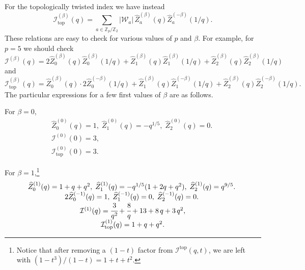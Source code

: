 \documentclass[hyper,letterpaper]{JHEP3}
\newcommand{\Z}{{\mathbb Z}}
\renewcommand{\hat}{\widehat}
\def\CI{{\mathcal I}}
\def\CW{{\mathcal W}}
\begin{document}
For the topologically twisted index we have instead
\begin{equation}
	\CI_\text{top}^{(\beta)}(q)=\sum_{a\in \Z_p/\Z_2}
	|\CW_a|\,\hat{Z}_a^{(\beta)}(q)\hat{Z}_a^{(-\beta)}(1/q).
	\label{Itopbeta-factorization}
\end{equation}
These relations are easy to check for various values of $p$ and $\beta$. For example, for $p=5$ we should check
\begin{equation}
	\CI^{(\beta)}(q)=2\hat{Z}_0^{(\beta)}(q)\hat{Z}_0^{(\beta)}(1/q)+
	\hat{Z}_1^{(\beta)}(q)\hat{Z}_1^{(\beta)}(1/q)+
	\hat{Z}_2^{(\beta)}(q)\hat{Z}_2^{(\beta)}(1/q)
\end{equation}
and
\begin{equation}
	\CI_\text{top}^{(\beta)}(q)=\hat{Z}_0^{(\beta)}(q)\cdot 2\hat{Z}_0^{(-\beta)}(1/q)+
	\hat{Z}_1^{(\beta)}(q)\hat{Z}_1^{(-\beta)}(1/q)+
	\hat{Z}_2^{(\beta)}(q)\hat{Z}_2^{(-\beta)}(1/q).
\end{equation}
The particular expressions for a few first values of $\beta$ are as follows.

For $\beta=0$,
\begin{equation}	
	\begin{array}{c}
	
	\hat{Z}_0^{(0)}(q)=1,\;
	\hat{Z}_1^{(0)}(q)=-q^{1/5},\;
	\hat{Z}_2^{(0)}(q)=0.\; \\
		\CI^{(0)}(0)=3 ,\\
	\CI_\text{top}^{(0)}(0)=3.
	\end{array}
\end{equation}

For $\beta=1$,\footnote{Notice that after removing a $(1-t)$ factor from $\CI^{\text{top}}(q,t)$, we are left with $(1-t^3)/(1-t)=1+t+t^2$.}
\begin{equation}		
	\begin{array}{c}

	\hat{Z}_0^{(1)}(q)=1+q+q^2,\;
	\hat{Z}_1^{(1)}(q)=-q^{1/5}(1+2q+q^2),\;
	\hat{Z}_2^{(1)}(q)=q^{9/5}.\;
	 \\
	2\hat{Z}_0^{(-1)}(q)=1,\;
	\hat{Z}_1^{(-1)}(q)=0,\;
	\hat{Z}_2^{(-1)}(q)=0.\;
	 \\
	 \CI^{(1)}(q)=\cfrac{3}{q^2}+\cfrac{8}{q}+ 13+8\,q+3\,q^2,
	 \\
\CI_\text{top}^{(1)}(q)=1+q+q^2 .
	\end{array}
\end{equation}
\end{document}
